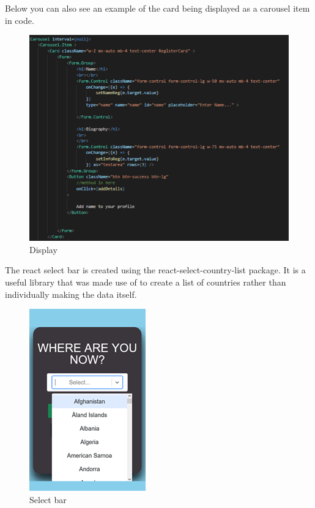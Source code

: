 Below you can also see an example of the card being displayed as a carousel item in code. \\
\begin{figure}[H]
    \centering
    \includegraphics{img/register6.png}
    \caption{Display} 
    \label{fig:my_label}
\end{figure}

The react select bar is created using the react-select-country-list package. It is a useful library that was made use of to create a list of countries rather than individually making the data itself. \\
\begin{figure}[H]
    \centering
    \includegraphics{img/register7.png}
    \caption{Select bar} 
    \label{fig:my_label}
\end{figure}

